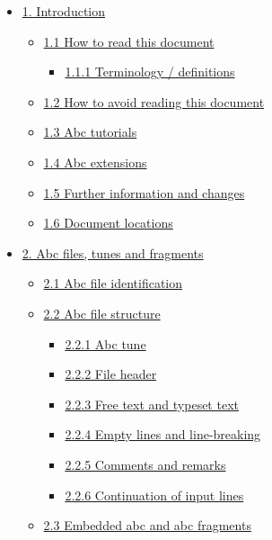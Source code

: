 \begin{itemize}
\item
  \protect\hyperlink{introduction}{1. Introduction}

  \begin{itemize}
  \item
    \protect\hyperlink{how_to_read_this_document}{1.1 How to read this
    document}

    \begin{itemize}
    \item
      \protect\hyperlink{terminology_definitions}{1.1.1 Terminology /
      definitions}
    \end{itemize}
  \item
    \protect\hyperlink{how_to_avoid_reading_this_document}{1.2 How to
    avoid reading this document}
  \item
    \protect\hyperlink{abc_tutorials}{1.3 Abc tutorials}
  \item
    \protect\hyperlink{abc_extensions}{1.4 Abc extensions}
  \item
    \protect\hyperlink{further_information_and_changes}{1.5 Further
    information and changes}
  \item
    \protect\hyperlink{document_locations}{1.6 Document locations}
  \end{itemize}
\item
  \protect\hyperlink{abc_files_tunes_and_fragments}{2. Abc files, tunes
  and fragments}

  \begin{itemize}
  \item
    \protect\hyperlink{abc_file_identification}{2.1 Abc file
    identification}
  \item
    \protect\hyperlink{abc_file_structure}{2.2 Abc file structure}

    \begin{itemize}
    \item
      \protect\hyperlink{abc_tune}{2.2.1 Abc tune}
    \item
      \protect\hyperlink{file_header}{2.2.2 File header}
    \item
      \protect\hyperlink{free_text_and_typeset_text}{2.2.3 Free text and
      typeset text}
    \item
      \protect\hyperlink{empty_lines_and_line-breaking}{2.2.4 Empty
      lines and line-breaking}
    \item
      \protect\hyperlink{comments_and_remarks}{2.2.5 Comments and
      remarks}
    \item
      \protect\hyperlink{continuation_of_input_lines}{2.2.6 Continuation
      of input lines}
    \end{itemize}
  \item
    \protect\hyperlink{embedded_abc_and_abc_fragments}{2.3 Embedded abc
    and abc fragments}


\end{itemize}
\end{itemize}
